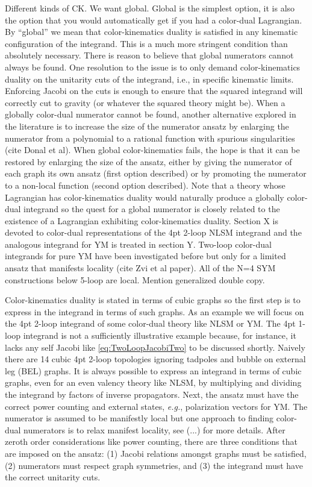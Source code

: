 \documentclass[11pt,letter]{article}
\begin{document}
Different kinds of CK.  We want global.  Global is the simplest
option, it is also the option that you would automatically get if you
had a color-dual Lagrangian.  By ``global'' we mean that
color-kinematics duality is satisfied in any kinematic configuration
of the integrand.  This is a much more stringent condition than
absolutely necessary.  There is reason to believe \cite{Bern:2015ooa} that global numerators cannot
always be found.  One resolution to the issue is to only demand
color-kinematics duality on the unitarity cuts of the integrand, i.e.,
in specific kinematic limits.  Enforcing Jacobi on the cuts is enough
to ensure that the squared integrand will correctly cut to gravity (or
whatever the squared theory might be).  When a globally color-dual
numerator cannot be found, another alternative explored in the
literature is to increase the size of the numerator ansatz by
enlarging the numerator from a polynomial to a rational function with
spurious singularities (cite Donal et al).  When global
color-kinematics fails, the hope is that it can be restored by
enlarging the size of the ansatz, either by giving the numerator of
each graph its own ansatz (first option described) or by promoting the
numerator to a non-local function (second option described).  Note
that a theory whose Lagrangian has color-kinematics duality would
naturally produce a globally color-dual integrand so the quest for a
global numerator is closely related to the existence of a Lagrangian
exhibiting color-kinematics duality.  Section X is devoted to
color-dual representations of the 4pt 2-loop NLSM integrand and the
analogous integrand for YM is treated in section Y.  Two-loop
color-dual integrands for pure YM have been investigated before but
only for a limited ansatz that manifests locality (cite Zvi et al
paper).  All of the N=4 SYM constructions below 5-loop are local.
Mention generalized double copy.

Color-kinematics duality is stated in terms of cubic graphs so the
first step is to express in the integrand in terms of such graphs.  As
an example we will focus on the 4pt 2-loop integrand of some
color-dual theory like NLSM or YM.  The 4pt 1-loop integrand is not a
sufficiently illustrative example because, for instance, it lacks any
self Jacobi like \cref{eq:TwoLoopJacobiTwo} to be discussed shortly.
Naively there are 14 cubic 4pt 2-loop topologies ignoring tadpoles and
bubble on external leg (BEL) graphs.  It is always possible to express
an integrand in terms of cubic graphs, even for an even valency theory
like NLSM, by multiplying and dividing the integrand by factors of
inverse propagators.  Next, the ansatz must have the correct power
counting and external states, \emph{e.g.}, polarization vectors for
YM.  The numerator is assumed to be manifestly local but one approach
to finding color-dual numerators is to relax manifest locality, see
(...) for more details.  After zeroth order considerations like power
counting, there are three conditions that are imposed on the ansatz:
(1) Jacobi relations amongst graphs must be satisfied, (2) numerators
must respect graph symmetries, and (3) the integrand must have the
correct unitarity cuts.
\end{document}
